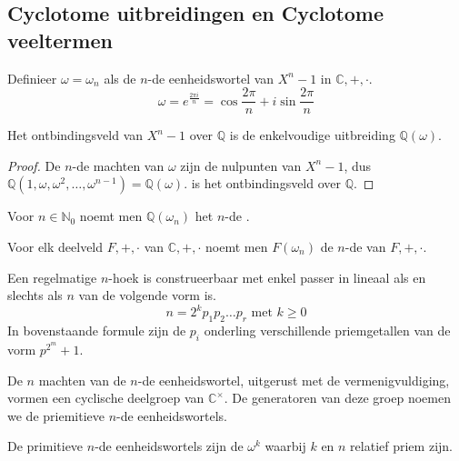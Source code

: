 \documentclass[main.tex]{subfiles}
\begin{document}
\subsection{Cyclotome uitbreidingen en Cyclotome veeltermen}
\label{sec:cycl-uitbr-en}

\begin{de}
  Definieer $\omega=\omega_{n}$ als de $n$-de eenheidswortel van $X^{n}-1$ in $\mathbb{C},+,\cdot$.
  \[ \omega = e^{\frac{2\pi i}{n}} = \cos\frac{2\pi}{n} + i\sin\frac{2\pi}{n} \]
\end{de}

\begin{st}
  Het ontbindingsveld van $X^{n}-1$ over $\mathbb{Q}$ is de enkelvoudige uitbreiding $\mathbb{Q}(\omega)$.

  \begin{proof}
    De $n$-de machten van $\omega$ zijn de nulpunten van $X^{n}-1$, dus $\mathbb{Q}(1,\omega,\omega^{2},\dotsc,\omega^{n-1}) = \mathbb{Q}(\omega)$. is het ontbindingsveld over $\mathbb{Q}$.
  \end{proof}
\end{st}

\begin{de}
  Voor $n\in \mathbb{N}_{0}$ noemt men $\mathbb{Q}(\omega_{n})$ het $n$-de .
\end{de}

\begin{de}
  Voor elk deelveld $F,+,\cdot$ van $\mathbb{C},+,\cdot$ noemt men $F(\omega_{n})$ de $n$-de  van $F,+,\cdot$.
\end{de}

\begin{st}
  Een regelmatige $n$-hoek is construeerbaar met enkel passer in lineaal als en slechts als $n$ van de volgende vorm is.
  \[ n = 2^{k}p_{1}p_{2}\dotsc p_{r} \text{ met } k\ge 0 \]
  In bovenstaande formule zijn de $p_{i}$ onderling verschillende priemgetallen van de vorm $p^{2^{m}} +1$.
  \zb
\end{st}

\begin{de}
  De $n$ machten van de $n$-de eenheidswortel, uitgerust met de vermenigvuldiging, vormen een cyclische deelgroep van $\mathbb{C}^{\times}$.
  De generatoren van deze groep noemen we de priemitieve $n$-de eenheidswortels.
\end{de}

\begin{ei}
  De primitieve $n$-de eenheidswortels zijn de $\omega^{k}$ waarbij $k$ en $n$ relatief priem zijn.
\end{ei}
\end{document}
